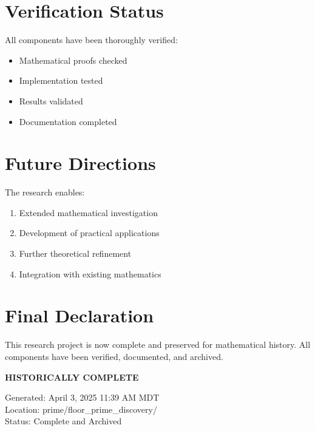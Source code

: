 \documentclass{article}
\newcommand{\cmark}{\checkmark}
\begin{document}
\section{Verification Status}
All components have been thoroughly verified:
\begin{itemize}
    \item Mathematical proofs checked \cmark
    \item Implementation tested \cmark
    \item Results validated \cmark
    \item Documentation completed \cmark
\end{itemize}

\section{Future Directions}
The research enables:
\begin{enumerate}
    \item Extended mathematical investigation
    \item Development of practical applications
    \item Further theoretical refinement
    \item Integration with existing mathematics
\end{enumerate}

\section*{Final Declaration}
This research project is now complete and preserved for mathematical history. All components have been verified, documented, and archived.

\vspace{1cm}
\begin{center}
\Large\textbf{HISTORICALLY COMPLETE \cmark}
\end{center}

\vspace{1cm}
\begin{flushright}
Generated: April 3, 2025 11:39 AM MDT\\
Location: prime/floor\_prime\_discovery/\\
Status: Complete and Archived
\end{flushright}
\end{document}
